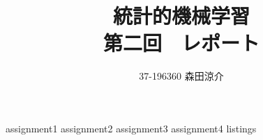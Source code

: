 \documentclass[dvipdfmx, fleqn, titlepage]{jsarticle}
\title{
	統計的機械学習 \\
	第二回　レポート
	}
\author{37-196360 \quad 森田涼介}
\begin{document}
\maketitle
{assignment1}
{assignment2}
{assignment3}
{assignment4}
\newpage
{listings}
\end{document}
